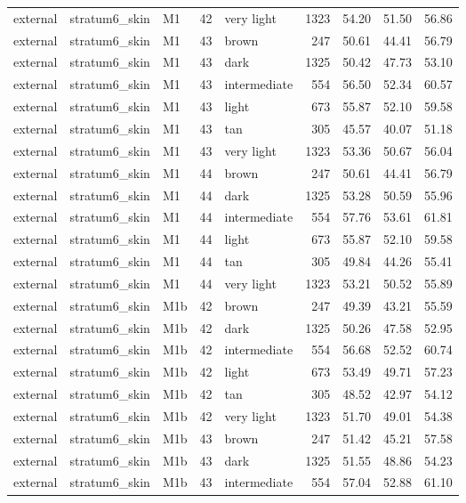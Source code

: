 \begin{tabular}{lllrlrrrr}
external & stratum6\_skin & M1 & 42 & very light & 1323 & 54.20 & 51.50 & 56.86 \\
external & stratum6\_skin & M1 & 43 & brown & 247 & 50.61 & 44.41 & 56.79 \\
external & stratum6\_skin & M1 & 43 & dark & 1325 & 50.42 & 47.73 & 53.10 \\
external & stratum6\_skin & M1 & 43 & intermediate & 554 & 56.50 & 52.34 & 60.57 \\
external & stratum6\_skin & M1 & 43 & light & 673 & 55.87 & 52.10 & 59.58 \\
external & stratum6\_skin & M1 & 43 & tan & 305 & 45.57 & 40.07 & 51.18 \\
external & stratum6\_skin & M1 & 43 & very light & 1323 & 53.36 & 50.67 & 56.04 \\
external & stratum6\_skin & M1 & 44 & brown & 247 & 50.61 & 44.41 & 56.79 \\
external & stratum6\_skin & M1 & 44 & dark & 1325 & 53.28 & 50.59 & 55.96 \\
external & stratum6\_skin & M1 & 44 & intermediate & 554 & 57.76 & 53.61 & 61.81 \\
external & stratum6\_skin & M1 & 44 & light & 673 & 55.87 & 52.10 & 59.58 \\
external & stratum6\_skin & M1 & 44 & tan & 305 & 49.84 & 44.26 & 55.41 \\
external & stratum6\_skin & M1 & 44 & very light & 1323 & 53.21 & 50.52 & 55.89 \\
external & stratum6\_skin & M1b & 42 & brown & 247 & 49.39 & 43.21 & 55.59 \\
external & stratum6\_skin & M1b & 42 & dark & 1325 & 50.26 & 47.58 & 52.95 \\
external & stratum6\_skin & M1b & 42 & intermediate & 554 & 56.68 & 52.52 & 60.74 \\
external & stratum6\_skin & M1b & 42 & light & 673 & 53.49 & 49.71 & 57.23 \\
external & stratum6\_skin & M1b & 42 & tan & 305 & 48.52 & 42.97 & 54.12 \\
external & stratum6\_skin & M1b & 42 & very light & 1323 & 51.70 & 49.01 & 54.38 \\
external & stratum6\_skin & M1b & 43 & brown & 247 & 51.42 & 45.21 & 57.58 \\
external & stratum6\_skin & M1b & 43 & dark & 1325 & 51.55 & 48.86 & 54.23 \\
external & stratum6\_skin & M1b & 43 & intermediate & 554 & 57.04 & 52.88 & 61.10 \\

\end{tabular}

